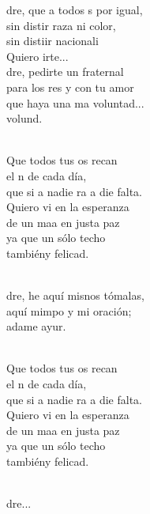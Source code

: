 \documentclass[12pt]{article}
\begin{document}
\begin{multicols*}{2}
\begin{cancion}%
	dre, que a todos s por igual,\\
	sin distir raza ni color,\\
	sin distiir nacionali\\
	Quiero irte...\\
\jump
	dre, pedirte un fraternal \\
	para los res y con tu amor\\
	que haya una ma voluntad...\\
	 volund. \\\jump\\
	\begin{chorus}%
	Que todos tus os recan\\
	el n de cada día,\\
	que si a nadie ra a die falta. \\
	Quiero vi en la esperanza\\
	de un maa en justa paz\\
	ya que  un sólo techo\\
	tambiény felicad.\\
	\end{chorus}%
	\jump\\
	dre, he aquí misnos tómalas,\\
	aquí mimpo y mi oración;\\
	adame ayur.  \\\jump\\
	\begin{chorus}%
	Que todos tus os recan\\
	el n de cada día,\\
	que si a nadie ra a die falta. \\
	Quiero vi en la esperanza\\
	de un maa en justa paz\\
	ya que  un sólo techo\\
	tambiény felicad.\\
	\end{chorus}%
	\jump\\
	dre...\\
\end{cancion}%


\end{multicols*}
\end{document}
